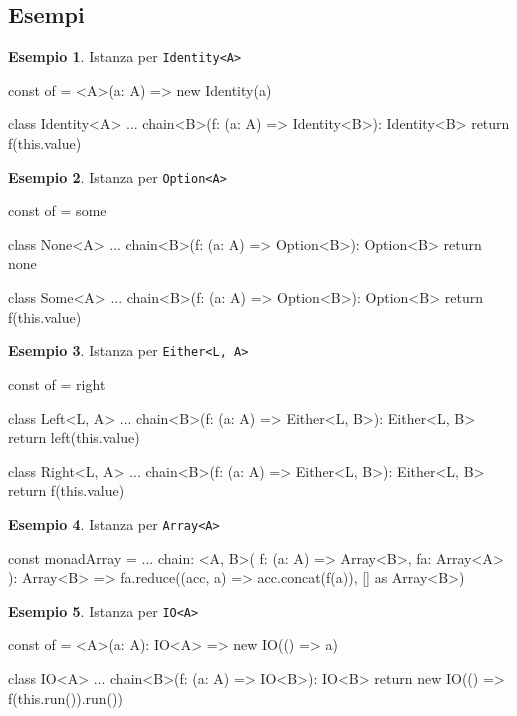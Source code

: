 \documentclass[12pt]{article}
\theoremstyle{definition}
\newtheorem{example}{Esempio}[section]
\newenvironment{code}
  {\vspace{0.5cm} \VerbatimEnvironment\begin{typescriptcode}}
  {\end{typescriptcode} \vspace{0.2cm}}
\begin{document}
\subsection{Esempi}

\begin{example}
Istanza per \texttt{Identity<A>}

\begin{code}
const of = <A>(a: A) => new Identity(a)

class Identity<A> {
  ...
  chain<B>(f: (a: A) => Identity<B>): Identity<B> {
    return f(this.value)
  }
}
\end{code}
\end{example}

\begin{example}
Istanza per \texttt{Option<A>}

\begin{code}
const of = some

class None<A> {
  ...
  chain<B>(f: (a: A) => Option<B>): Option<B> {
    return none
  }
}

class Some<A> {
  ...
  chain<B>(f: (a: A) => Option<B>): Option<B> {
    return f(this.value)
  }
}
\end{code}
\end{example}

\begin{example}
Istanza per \texttt{Either<L, A>}

\begin{code}
const of = right

class Left<L, A> {
  ...
  chain<B>(f: (a: A) => Either<L, B>): Either<L, B> {
    return left(this.value)
  }
}

class Right<L, A> {
  ...
  chain<B>(f: (a: A) => Either<L, B>): Either<L, B> {
    return f(this.value)
  }
}
\end{code}
\end{example}

\begin{example}
Istanza per \texttt{Array<A>}

\begin{code}
const monadArray = {
  ...
  chain: <A, B>(
    f: (a: A) => Array<B>,
    fa: Array<A>
  ): Array<B> =>
    fa.reduce((acc, a) => acc.concat(f(a)), [] as Array<B>)
}
\end{code}
\end{example}

\begin{example}
Istanza per \texttt{IO<A>}

\begin{code}
const of = <A>(a: A): IO<A> => new IO(() => a)

class IO<A> {
  ...
  chain<B>(f: (a: A) => IO<B>): IO<B> {
    return new IO(() => f(this.run()).run())
  }
}
\end{code}
\end{example}
\end{document}
